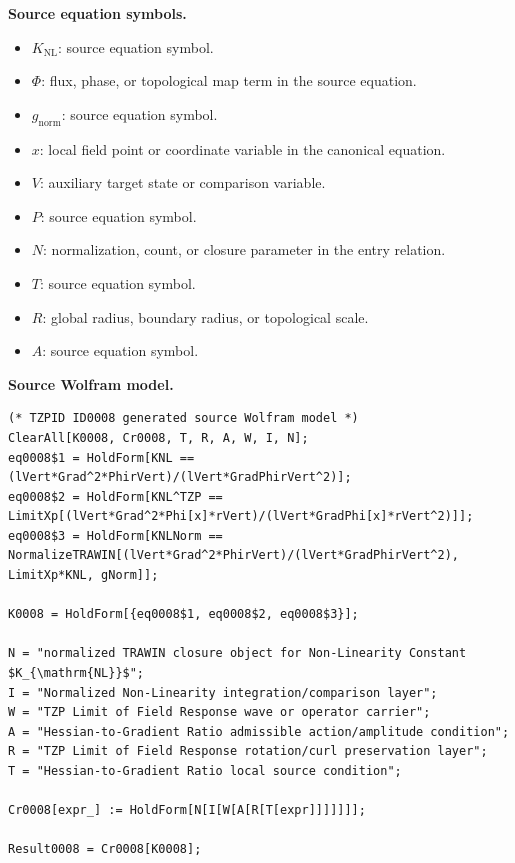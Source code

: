 \begin{minipage}[t]{0.49\linewidth}
\begingroup
\small
\raggedright
\textbf{Source equation symbols.}\par
\begin{itemize}[leftmargin=1.35em,itemsep=1pt,topsep=1pt,parsep=0pt]
    \item $K_{\mathrm{NL}}$: source equation symbol.
    \item $\Phi$: flux, phase, or topological map term in the source equation.
    \item $g_{\mathrm{norm}}$: source equation symbol.
    \item $x$: local field point or coordinate variable in the canonical equation.
    \item $V$: auxiliary target state or comparison variable.
    \item $P$: source equation symbol.
    \item $N$: normalization, count, or closure parameter in the entry relation.
    \item $T$: source equation symbol.
    \item $R$: global radius, boundary radius, or topological scale.
    \item $A$: source equation symbol.
\end{itemize}
\endgroup
\end{minipage}\hfill
\begin{minipage}[t]{0.47\linewidth}
\begingroup
\scriptsize
\raggedright
\textbf{Source Wolfram model.}\par
\begin{Verbatim}[fontsize=\tiny,breaklines=true,breakanywhere=true]
(* TZPID ID0008 generated source Wolfram model *)
ClearAll[K0008, Cr0008, T, R, A, W, I, N];
eq0008$1 = HoldForm[KNL == (lVert*Grad^2*PhirVert)/(lVert*GradPhirVert^2)];
eq0008$2 = HoldForm[KNL^TZP == LimitXp[(lVert*Grad^2*Phi[x]*rVert)/(lVert*GradPhi[x]*rVert^2)]];
eq0008$3 = HoldForm[KNLNorm == NormalizeTRAWIN[(lVert*Grad^2*PhirVert)/(lVert*GradPhirVert^2), LimitXp*KNL, gNorm]];

K0008 = HoldForm[{eq0008$1, eq0008$2, eq0008$3}];

N = "normalized TRAWIN closure object for Non-Linearity Constant $K_{\mathrm{NL}}$";
I = "Normalized Non-Linearity integration/comparison layer";
W = "TZP Limit of Field Response wave or operator carrier";
A = "Hessian-to-Gradient Ratio admissible action/amplitude condition";
R = "TZP Limit of Field Response rotation/curl preservation layer";
T = "Hessian-to-Gradient Ratio local source condition";

Cr0008[expr_] := HoldForm[N[I[W[A[R[T[expr]]]]]]];

Result0008 = Cr0008[K0008];
\end{Verbatim}
\endgroup
\end{minipage}

